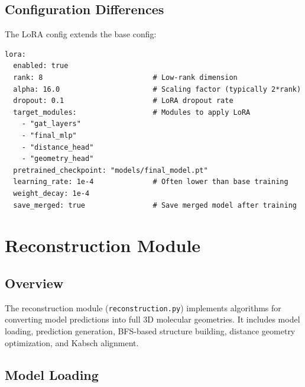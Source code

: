 \documentclass[11pt,a4paper]{article}
\begin{document}
\subsection{Configuration Differences}

The LoRA config extends the base config:

\begin{lstlisting}[caption={LoRA Configuration Extension}]
lora:
  enabled: true
  rank: 8                          # Low-rank dimension
  alpha: 16.0                      # Scaling factor (typically 2*rank)
  dropout: 0.1                     # LoRA dropout rate
  target_modules:                  # Modules to apply LoRA
    - "gat_layers"
    - "final_mlp"
    - "distance_head"
    - "geometry_head"
  pretrained_checkpoint: "models/final_model.pt"
  learning_rate: 1e-4              # Often lower than base training
  weight_decay: 1e-4
  save_merged: true                # Save merged model after training
\end{lstlisting}

\clearpage

\section{Reconstruction Module}

\subsection{Overview}

The reconstruction module (\texttt{reconstruction.py}) implements algorithms for converting model predictions into full 3D molecular geometries. It includes model loading, prediction generation, BFS-based structure building, distance geometry optimization, and Kabsch alignment.

\subsection{Model Loading}
\end{document}
